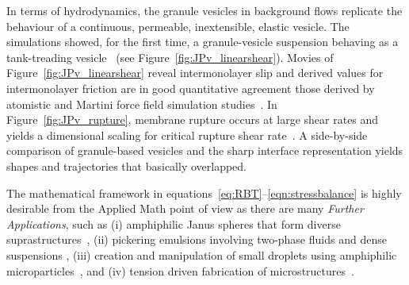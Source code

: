 In terms of hydrodynamics, the granule vesicles in background flows
replicate the behaviour of a continuous, permeable, inextensible,
elastic vesicle. The simulations showed, for the first time, a
granule-vesicle suspension behaving as a tank-treading
vesicle~\cite{Finken2008, Shaqfeh11} (see
Figure~\ref{fig:JPv_linearshear}). Movies of
Figure~\ref{fig:JPv_linearshear} reveal intermonolayer slip and derived
values for intermonolayer friction are in good quantitative agreement
those derived by atomistic and Martini force field simulation
studies~\cite{WuoEd06, denOtter2007, SHKULIPA2005823, Zgorski2019}. In
Figure~\ref{fig:JPv_rupture}, membrane rupture occurs at large shear
rates and yields a dimensional scaling for critical rupture shear
rate~\cite{VLAHOVSKA2009775, keller_skalak_1982}. A side-by-side
comparison of granule-based vesicles and the sharp interface
representation yields shapes and trajectories that basically overlapped.

The mathematical framework in
equations~\eqref{eq:RBT}--\eqref{eqn:stressbalance} is highly desirable
from the Applied Math point of view as there are many \emph{Further
Applications}, such as (i) amphiphilic Janus spheres that form diverse
suprastructures~\cite{HaBr20, McBr21, Bradley2017}, (ii) pickering
emulsions involving two-phase fluids and dense suspensions
\cite{Bradley2016}, (iii) creation and manipulation of small droplets
using amphiphilic microparticles~\cite{Ha2022SurfaceEM,
Ha2020MinimalSC}, and (iv) tension driven fabrication of
microstructures~\cite{Dasgupta2017, Leong2007, Reynolds2019, Cho2010,
Zeng20223DprintedMT, Russell2016EnergyLF}.

